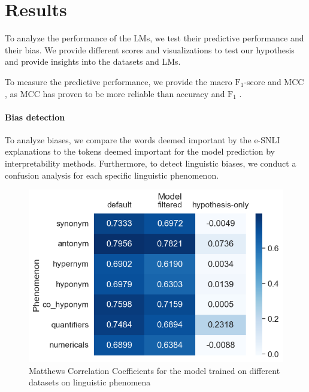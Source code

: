 \section{Results} \label{sec:results}

To analyze the performance of the \acp{LM}, we test their predictive performance and their bias. We provide different scores and visualizations to test our hypothesis and provide insights into the datasets and \acp{LM}.

To measure the predictive performance, we provide the macro $\text{F}_1$-score \cite{macrof1} and \ac{MCC} \cite{mcc}, as \ac{MCC} has proven to be more reliable than accuracy and $\text{F}_1$ \cite{mccGood}.

\paragraph{Bias detection}
To analyze biases, we compare the words deemed important by the \ac{e-SNLI} explanations to the tokens deemed important for the model prediction by interpretability methods. Furthermore, to detect linguistic biases, we conduct a confusion analysis for each specific linguistic phenomenon.

\begin{figure}[ht]
    \centering
    \includegraphics[width=0.9\columnwidth]{./images/metric_heatmaps_phenomena/important_words/matthews_correlation.png}
    \caption{Matthews Correlation Coefficients for the model trained on different datasets on linguistic phenomena}
    \label{fig:metric-heatmap-phenomena-mcc}
\end{figure}

